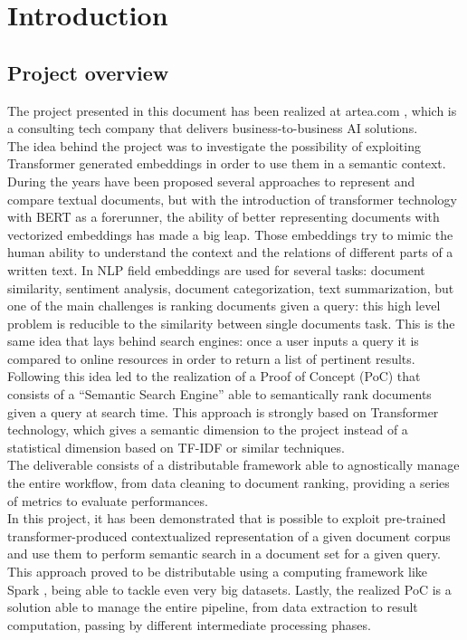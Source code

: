 \documentclass[\main/main.tex]{subfiles}
\begin{document}
\chapter*{Introduction}
\section*{Project overview}
The project presented in this document has been realized at artea.com \cite{artea}, which is a consulting tech company that delivers business-to-business AI solutions. \\
The idea behind the project was to investigate the possibility of exploiting Transformer generated embeddings in order to use them in a semantic context. During the years have been proposed several approaches to represent and compare textual documents, but with the introduction of transformer technology with BERT as a forerunner, the ability of better representing documents with vectorized embeddings has made a big leap. Those embeddings try to mimic the human ability to understand the context and the relations of different parts of a written text. In NLP field embeddings are used for several tasks: document similarity, sentiment analysis, document categorization, text summarization, but one of the main challenges is ranking documents given a query: this high level problem is reducible to the similarity between single documents task. This is the same idea that lays behind search engines: once a user inputs a query it is compared to online resources in order to return a list of pertinent results. \\
Following this idea led to the realization of a Proof of Concept (PoC) that consists of a ``Semantic Search Engine'' able to semantically rank documents given a query at search time. This approach is strongly based on Transformer technology, which gives a semantic dimension to the project instead of a statistical dimension based on TF-IDF or similar techniques. \\
The deliverable consists of a distributable framework able to agnostically manage the entire workflow, from data cleaning to document ranking, providing a series of metrics to evaluate performances. \\
In this project, it has been demonstrated that is possible to exploit pre-trained transformer-produced contextualized representation of a given document corpus and use them to perform semantic search in a document set for a given query. This approach proved to be distributable using a computing framework like Spark \cite{zaharia2010spark}, being able to tackle even very big datasets. Lastly, the realized PoC is a solution able to manage the entire pipeline, from data extraction to result computation, passing by different intermediate processing phases.
\end{document}
